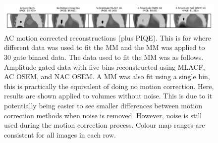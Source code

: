             \begin{figure}
                \centering
                
                \includegraphics[width=1.0\linewidth]{figures/motion_correction_2_results_2_noiseless_5_amplitude_visual_analysis.png}
                
                \captionsetup{singlelinecheck=false}
                \caption{
                    \gls{AC} motion corrected reconstructions (plus \gls{PIQE}). This is for where different data was used to fit the \gls{MM} and the \gls{MM} was applied to $30$ gate binned data. The data used to fit the \gls{MM} was as follows. Amplitude gated data with five bins reconstructed using \gls{MLACF}, \gls{AC} \gls{OSEM}, and \gls{NAC} \gls{OSEM}. A \gls{MM} was also fit using a single bin, this is practically the equivalent of doing no motion correction. Here, results are shown applied to volumes without noise. This is due to it potentially being easier to see smaller differences between motion correction methods when noise is removed. However, noise is still used during the motion correction process. Colour map ranges are consistent for all images in each row.
                }
                
                \label{fig:evaluation_of_pet_ct_motion_correction_incorporating_motion_models_using_mlacf_and_complex_gating_schemes_results_noiseless_5_amplitude_visual_analysis}
            \end{figure}

